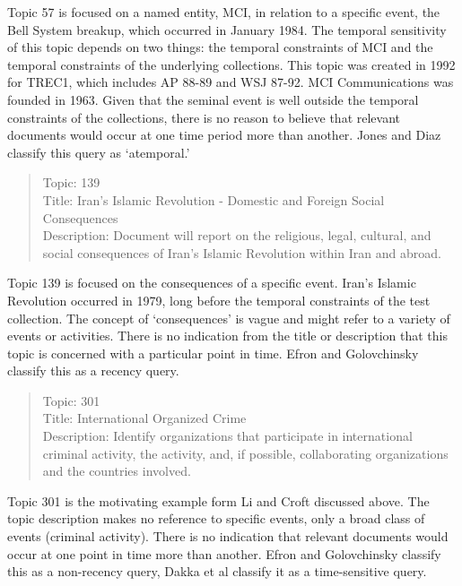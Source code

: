 \documentclass{sig-alternate}
\begin{document}
Topic 57 is focused on a named entity, MCI, in relation to a specific event, the Bell System breakup, which occurred in January 1984. The temporal sensitivity of this topic depends on two things: the temporal constraints of MCI and the temporal constraints of the underlying collections. This topic was created in 1992 for TREC1, which includes AP 88-89 and WSJ 87-92. MCI Communications was founded in 1963. Given that the seminal event is well outside the temporal constraints of the collections, there is no reason to believe that relevant documents would occur at one time period more than another.  Jones and Diaz classify this query as `atemporal.'

\begin{quote}
Topic: 139  \\
Title: Iran's Islamic Revolution - Domestic and Foreign Social  Consequences	 \\
Description: Document will report on the religious, legal, cultural, and social  consequences of Iran's Islamic Revolution within Iran and abroad. \\
\end{quote}

Topic 139 is focused on the consequences of a specific event. Iran's Islamic Revolution occurred in 1979, long before the temporal constraints of the test collection. The concept of `consequences' is vague and might refer to a variety of events or activities. There is no indication from the title or description that this topic is concerned with a particular point in time.  Efron and Golovchinsky classify this as a recency query.

\begin{quote}
Topic: 301 \\
Title: International Organized Crime \\
Description: Identify organizations that participate in international criminal activity, the activity, and, if possible, collaborating organizations and the countries involved. \\
\end{quote}

Topic 301 is the motivating example form Li and Croft discussed above.  The topic description makes no reference to specific events, only a broad class of events (criminal activity).  There is no indication that relevant documents would occur at one point in time more than another. Efron and Golovchinsky classify this as a non-recency query, Dakka et al classify it as a time-sensitive query.
\end{document}

